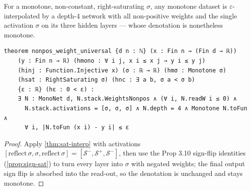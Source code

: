 \begin{proposition}\label{prop:nonpos}
  \leanok
  For a monotone, non-constant, right-saturating $\sigma$, any monotone dataset is
  $\varepsilon$-interpolated by a depth-4 network with all non-positive weights and the single
  activation $\sigma$ on its three hidden layers --- whose denotation is nonetheless monotone.
\end{proposition}
\begin{verbatim}
theorem nonpos_weight_universal {d n : ℕ} (x : Fin n → (Fin d → ℝ))
    (y : Fin n → ℝ) (hmono : ∀ i j, x i ≤ x j → y i ≤ y j)
    (hinj : Function.Injective x) (σ : ℝ → ℝ) (hmσ : Monotone σ)
    (hsat : RightSaturating σ) (hnc : ∃ a b, σ a < σ b)
    {ε : ℝ} (hε : 0 < ε) :
    ∃ N : MonoNet d, N.stack.WeightsNonpos ∧ (∀ i, N.readW i ≤ 0) ∧
      N.stack.activations = [σ, σ, σ] ∧ N.depth = 4 ∧ Monotone N.toFun ∧
      ∀ i, |N.toFun (x i) - y i| ≤ ε
\end{verbatim}
\begin{proof}\leanok
  Apply \cref{thm:sat-interp} with activations $[\mathrm{reflect}\,\sigma,\sigma,
  \mathrm{reflect}\,\sigma]=[\mathcal{S}^-,\mathcal{S}^+,\mathcal{S}^-]$, then use the Prop 3.10
  sign-flip identities (\cref{prop:sign-sat}) to turn every layer into $\sigma$ with negated
  weights; the final output sign flip is absorbed into the read-out, so the denotation is
  unchanged and stays monotone.
\end{proof}
